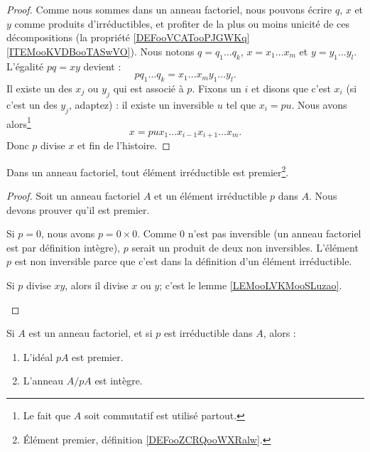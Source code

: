 \begin{proof}
	Comme nous sommes dans un anneau factoriel, nous pouvons écrire \( q\), \(x\) et \( y\) comme produits d'irréductibles, et profiter de la plus ou moins unicité de ces décompositions (la propriété \ref{DEFooVCATooPJGWKq}\ref{ITEMooKVDBooTASwVO}). Nous notons \( q=q_1\ldots q_k\), \( x=x_1\ldots x_m\) et \( y=y_1\ldots y_l\). L'égalité \( pq=xy\) devient :
	\begin{equation}
		pq_1\ldots q_k=x_1\ldots x_my_1\ldots y_l.
	\end{equation}
	Il existe un des \( x_j\) ou \( y_j\) qui est associé à \( p\). Fixons un \( i\) et disons que c'est \( x_i\) (si c'est un des \( y_j\), adaptez) : il existe un inversible \( u\) tel que \( x_i=pu\). Nous avons alors\footnote{Le fait que \( A\) soit commutatif est utilisé partout.}
	\begin{equation}
		x=pux_1\ldots x_{i-1}x_{i+1}\ldots x_m.
	\end{equation}
	Donc \( p\) divise \( x\) et fin de l'histoire.
\end{proof}

\begin{proposition}		\label{PROPooOQSXooYidPQv}
	Dans un anneau factoriel, tout élément irréductible est premier\footnote{Élément premier, définition \ref{DEFooZCRQooWXRalw}.}.
\end{proposition}

\begin{proof}
	Soit un anneau factoriel \( A\) et un élément irréductible \( p\) dans \( A\). Nous devons prouver qu'il est premier.
	\begin{subproof}
		Si \( p=0\), nous avons \( p=0\times 0\). Comme \( 0\) n'est pas inversible (un anneau factoriel est par définition intègre), \( p\) serait un produit de deux non inversibles.
		L'élément \( p\) est non inversible parce que c'est dans la définition d'un élément irréductible.

		\spitem[Si \( p\divides xy\)]
		Si \( p\) divise \( xy\), alors il divise \( x\) ou \( y\); c'est le lemme \ref{LEMooLVKMooSLuzao}.
	\end{subproof}
\end{proof}

\begin{lemma}		\label{LEMooGKOSooRKtfDJ}
	Si \( A\) est un anneau factoriel, et si \( p\) est irréductible dans \( A\), alors :
	\begin{enumerate}
		\item
		      L'idéal \( pA\) est premier.
		\item
		      L'anneau \( A/pA\) est intègre.
	\end{enumerate}
\end{lemma}

